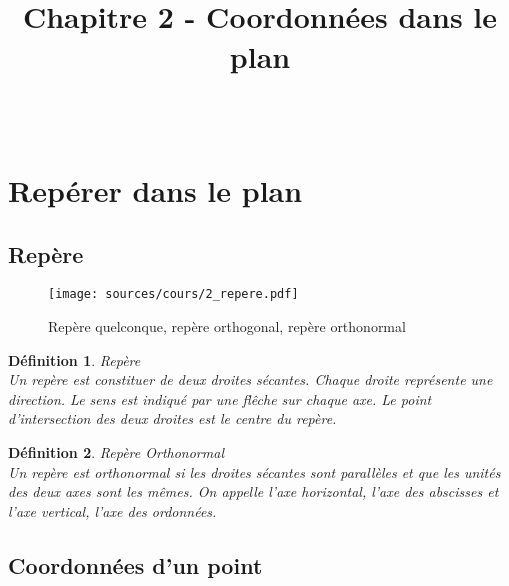 \documentclass[paper=a4, fontsize=9pt]{scrartcl} %
\title{	
  \vspace{-10ex}
  \horrule{0.5pt} \\[0.4cm] %
  \huge Chapitre 2 - Coordonnées dans le plan\\ %
  \horrule{2pt} \\[0.5cm] %
}
\author{}
\date{\vspace{-10ex}} %
\begin{document}

\newtheorem{Definition}{Définition}
\newtheorem{Theorem}{Théorème}
\newtheorem{Proposition}{Propriété}

\renewcommand{\labelitemi}{$\bullet$}
\renewcommand{\labelitemii}{$\circ$}

\maketitle %
\setlength{\columnseprule}{1pt}

\section{Repérer dans le plan}
\subsection{Repère}

\begin{figure}[H]
  \centering
  \texttt{[image: sources/cours/2\_repere.pdf]}
  \caption{Repère quelconque, repère orthogonal, repère orthonormal}
\end{figure}

\begin{Definition}Repère\\
  Un repère est constituer de deux droites sécantes. Chaque droite représente une direction. Le sens est indiqué par une flêche sur chaque axe. Le point d'intersection des deux droites est le centre du repère. 
\end{Definition}

\begin{Definition}Repère Orthonormal\\
  Un repère est orthonormal si les droites sécantes sont parallèles et que les unités des deux axes sont les mêmes. On appelle l'axe horizontal, l'axe des abscisses et l'axe vertical, l'axe des ordonnées.
\end{Definition}

\subsection{Coordonnées d'un point}
\end{document}
